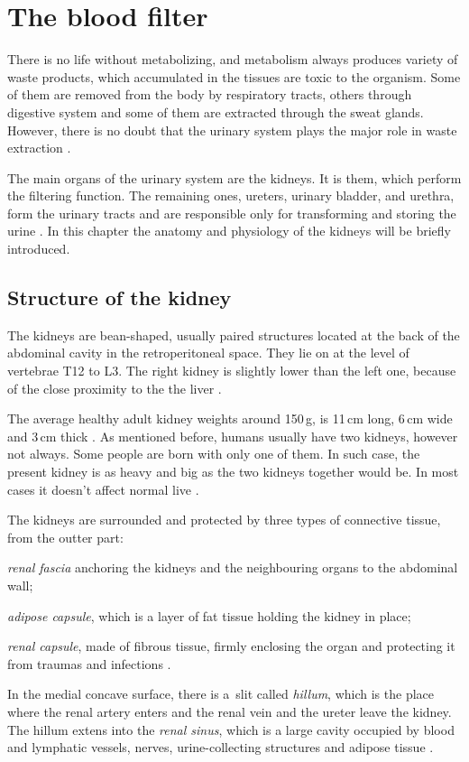 \chapter{The blood filter}
	
There is no life without metabolizing, and metabolism always produces variety of waste products, which accumulated in the tissues are toxic to the organism. Some of them are removed from the body by respiratory tracts, others through digestive system and some of them are extracted through the sweat glands. However, there is no doubt that the urinary system plays the major role in waste extraction \cite{saladin, health_and_disease}.

The main organs of the urinary system are the kidneys. It is them, which perform the filtering function. The remaining ones,  ureters, urinary bladder, and urethra, form the urinary tracts and are responsible only for transforming and storing the urine \cite{saladin}. In this chapter the anatomy and physiology of the kidneys will be briefly introduced.

\section{Structure of the kidney} 

The kidneys are  bean-shaped, usually paired structures located at the back of the abdominal cavity in the retroperitoneal space. They lie on at the level of vertebrae T12 to L3.
The right kidney is slightly lower than the left one, because of the close proximity to the the liver \cite{saladin, health_and_disease}. 

The average healthy adult kidney weights around 150\,g, is 11\,cm long, 6\,cm wide and 3\,cm thick \cite{kidney_dimensions, saladin}. As mentioned before, humans usually have two kidneys, however not always.  Some people are born with only one of them.  In such case, the present kidney is as heavy and big as the two kidneys together would be. In most cases it doesn't affect normal live \cite{onekidney}. 

The kidneys are surrounded and protected by three types of connective tissue, from the outter part: 
\begin{inparaenum}[(1\upshape)]
\item \textit{renal fascia} anchoring the kidneys and the neighbouring organs to the abdominal wall;
\item \textit{adipose capsule}, which is a layer of fat tissue holding the kidney in place;
\item \textit{renal capsule}, made of fibrous tissue, firmly enclosing the organ and protecting it from traumas and infections \cite{saladin, health_and_disease}.
\end{inparaenum} In the medial concave surface, there is a~slit called \textit{hillum}, which is the place where the  renal  artery enters and the renal vein and the ureter leave the kidney. The hillum extens into the \textit{renal sinus}, which is a large cavity occupied by blood and lymphatic vessels, nerves, urine-collecting structures and adipose tissue \cite{health_and_disease}.

